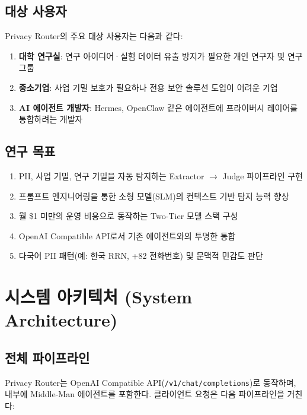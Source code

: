 \documentclass[11pt,a4paper]{article}
\begin{document}
\subsection{대상 사용자}

Privacy Router의 주요 대상 사용자는 다음과 같다:

\begin{enumerate}[nosep]
  \item \textbf{대학 연구실}: 연구 아이디어·실험 데이터 유출 방지가 필요한 개인 연구자 및 연구 그룹
  \item \textbf{중소기업}: 사업 기밀 보호가 필요하나 전용 보안 솔루션 도입이 어려운 기업
  \item \textbf{AI 에이전트 개발자}: Hermes, OpenClaw 같은 에이전트에 프라이버시 레이어를 통합하려는 개발자
\end{enumerate}

\subsection{연구 목표}

\begin{enumerate}[nosep]
  \item PII, 사업 기밀, 연구 기밀을 자동 탐지하는 Extractor $\rightarrow$ Judge 파이프라인 구현
  \item 프롬프트 엔지니어링을 통한 소형 모델(SLM)의 컨텍스트 기반 탐지 능력 향상
  \item 월 \$1 미만의 운영 비용으로 동작하는 Two-Tier 모델 스택 구성
  \item OpenAI Compatible API로서 기존 에이전트와의 투명한 통합
  \item 다국어 PII 패턴(예: 한국 RRN, +82 전화번호) 및 문맥적 민감도 판단
\end{enumerate}

\section{시스템 아키텍처 (System Architecture)}

\subsection{전체 파이프라인}

Privacy Router는 OpenAI Compatible API(\texttt{/v1/chat/completions})로 동작하며, 내부에 Middle-Man 에이전트를 포함한다. 클라이언트 요청은 다음 파이프라인을 거친다:
\end{document}
